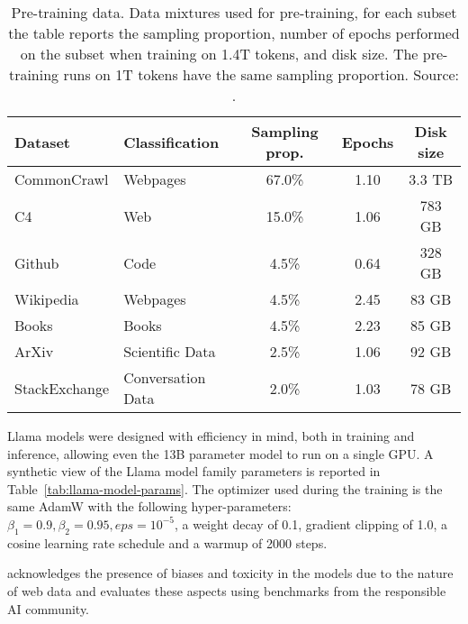 \begin{table}[h!]
	\centering
	\begin{tabularx}{\textwidth}{Xlccc}
		\hline
		\textbf{Dataset} & \textbf{Classification} & \textbf{Sampling prop.} & \textbf{Epochs} & \textbf{Disk size} \\
		\hline
		CommonCrawl      & Webpages                & 67.0\%                  & 1.10            & 3.3 TB             \\
		C4               & Web                     & 15.0\%                  & 1.06            & 783 GB             \\
		Github           & Code                    & 4.5\%                   & 0.64            & 328 GB             \\
		Wikipedia        & Webpages                & 4.5\%                   & 2.45            & 83 GB              \\
		Books            & Books                   & 4.5\%                   & 2.23            & 85 GB              \\
		ArXiv            & Scientific Data         & 2.5\%                   & 1.06            & 92 GB              \\
		StackExchange    & Conversation Data       & 2.0\%                   & 1.03            & 78 GB              \\
		\hline
	\end{tabularx}
	\caption{Pre-training data. Data mixtures used for pre-training, for each subset the table reports the sampling proportion, number of epochs performed on the subset when training on 1.4T tokens, and disk size. The pre-training runs on 1T tokens have the same sampling proportion. Source: \textcite{touvron2023llama}.}
	\label{tab:llama-pretraining-data}
\end{table}

Llama models were designed with efficiency in mind, both in training and inference, allowing even the 13B parameter model to run on a single GPU\@.
A synthetic view of the Llama model family parameters is reported in Table~\ref{tab:llama-model-params}.
The optimizer used during the training is the same AdamW with the following hyper-parameters: $\beta_1=0.9, \beta_2=0.95, eps=10^{-5}$, a weight decay of 0.1, gradient clipping of 1.0, a cosine learning rate schedule and a warmup of 2000 steps.

\textcite{touvron2023llama} acknowledges the presence of biases and toxicity in the models due to the nature of web data and evaluates these aspects using benchmarks from the responsible AI community.

